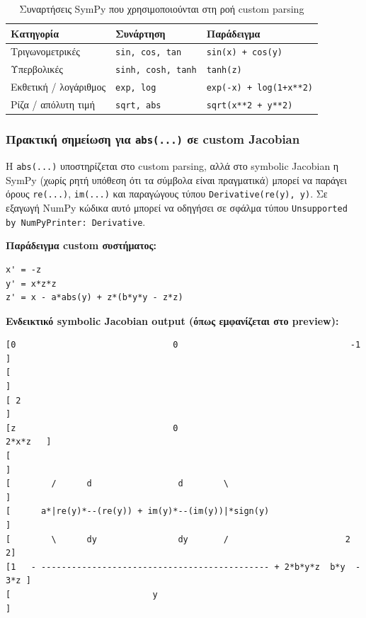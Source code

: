 \documentclass[11pt,a4paper]{report}
\begin{document}
\begin{table}[H]
\centering
\caption{Συναρτήσεις SymPy που χρησιμοποιούνται στη ροή custom parsing}
\label{tab:ch2-sympy-functions}
\renewcommand{\arraystretch}{1.15}
\begin{tabular}{|p{}|p{}|p{}|}
\hline
\textbf{Κατηγορία} & \textbf{Συνάρτηση} & \textbf{Παράδειγμα} \\
\hline
Τριγωνομετρικές & \texttt{sin, cos, tan} & \texttt{sin(x) + cos(y)} \\
\hline
Υπερβολικές & \texttt{sinh, cosh, tanh} & \texttt{tanh(z)} \\
\hline
Εκθετική / λογάριθμος & \texttt{exp, log} & \texttt{exp(-x) + log(1+x**2)} \\
\hline
Ρίζα / απόλυτη τιμή & \texttt{sqrt, abs} & \texttt{sqrt(x**2 + y**2)} \\
\hline
\end{tabular}
\end{table}

\subsubsection{Πρακτική σημείωση για \texttt{abs(...)} σε custom Jacobian}
\label{subsec:abs-custom-jacobian}

\begin{importantbox}
Η \texttt{abs(...)} υποστηρίζεται στο custom parsing, αλλά στο symbolic Jacobian
η SymPy (χωρίς ρητή υπόθεση ότι τα σύμβολα είναι πραγματικά) μπορεί να παράγει
όρους \texttt{re(...)}, \texttt{im(...)} και παραγώγους τύπου
\texttt{Derivative(re(y), y)}. Σε εξαγωγή NumPy κώδικα αυτό μπορεί να οδηγήσει
σε σφάλμα τύπου
\texttt{Unsupported by NumPyPrinter: Derivative}.
\end{importantbox}

\textbf{Παράδειγμα custom συστήματος:}
\begin{verbatim}
x' = -z
y' = x*z*z
z' = x - a*abs(y) + z*(b*y*y - z*z)
\end{verbatim}

\textbf{Ενδεικτικό symbolic Jacobian output (όπως εμφανίζεται στο preview):}
\begin{verbatim}
[0                               0                                  -1     ]
[                                                                          ]
[ 2                                                                        ]
[z                               0                                 2*x*z   ]
[                                                                          ]
[        /      d                 d        \                               ]
[      a*|re(y)*--(re(y)) + im(y)*--(im(y))|*sign(y)                       ]
[        \      dy                dy       /                       2      2]
[1   - --------------------------------------------- + 2*b*y*z  b*y  - 3*z ]
[                            y                                             ]
\end{verbatim}
\end{document}
